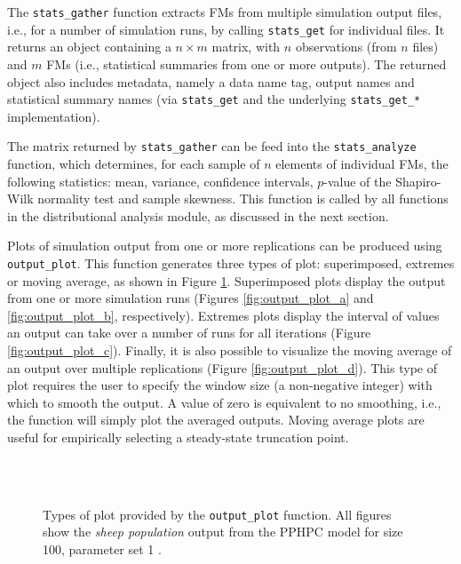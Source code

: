 \documentclass{article}
\newcommand{\progfunc}{\textnhtt}
\begin{document}
The \progfunc{stats\_gather} function extracts FMs from multiple simulation output files, i.e., for a number of simulation runs, by calling \progfunc{stats\_get} for individual files. It returns an object containing a $n \times m$ matrix, with $n$ observations (from $n$ files) and $m$ FMs (i.e., statistical summaries from one or more outputs). The returned object also includes metadata, namely a data name tag, output names and statistical summary names (via \progfunc{stats\_get} and the underlying \progfunc{stats\_get\_*} implementation).

The matrix returned by \progfunc{stats\_gather} can be feed into the \progfunc{stats\_analyze} function, which determines, for each sample of $n$ elements of individual FMs, the following statistics: mean, variance, confidence intervals, $p$-value of the Shapiro-Wilk normality test \cite{shapiro1965analysis} and sample skewness. This function is called by all functions in the distributional analysis module, as discussed in the next section.

Plots of simulation output from one or more replications can be produced using \progfunc{output\_plot}. This function generates three types of plot: superimposed, extremes or moving average, as shown in Figure \ref{fig:output_plot}. Superimposed plots display the output from one or more simulation runs (Figures \ref{fig:output_plot_a} and \ref{fig:output_plot_b}, respectively). Extremes plots display the interval of values an output can take over a number of runs for all iterations (Figure \ref{fig:output_plot_c}). Finally, it is also possible to visualize the moving average of an output over multiple replications (Figure \ref{fig:output_plot_d}). This type of plot requires the user to specify the window size (a non-negative integer) with which to smooth the output. A value of zero is equivalent to no smoothing, i.e., the function will simply plot the averaged outputs. Moving average plots are useful for empirically selecting a steady-state truncation point.

\begin{figure}[ht]
	\centering
	
	\quad
	 \\
	\quad
	 \\
	\caption{Types of plot provided by the \progfunc{output\_plot} function. All figures show the \textit{sheep population} output from the PPHPC model for size 100, parameter set 1 \cite{fachada2015template}.}
	\label{fig:output_plot}
\end{figure}
\end{document}
